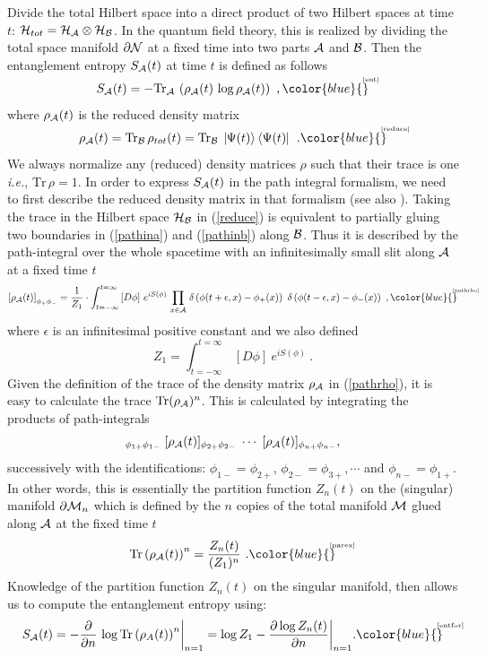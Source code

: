 \documentclass[12pt]{article}
\newcommand{\be}{\begin{equation}}
\newcommand{\ee}{\end{equation}}
\def\req#1{(\ref{#1})}
\def\[{\left [}
\def\]{\right ]}
\def\({\left (}
\def\){\right )}
\def\ie{{\it i.e.}}
\def\eps{\epsilon}
\def\p{\partial}
\def\CA{{\cal A}}
\def\CB{{\cal B}}
\def\CH{{\cal H}}
\def\p{\partial}
\def\p{\partial}
\def\ket#1{\mid  \! \! #1   \rangle}
\def\bra#1{\langle   #1 \! \! \mid}
\def\Label#1{\label{#1}%
{ \color{blue}{\smash{\hbox to0pt{\raise2ex\hbox{\tiny[#1]}\hss}}}}}
\def\bdy{\p{\cal M}}
\def\bdys{\p{\cal N}}
\def\rA{\CA}
\def\rB{\CB}
\begin{document}
Divide the total Hilbert space into a direct product of two Hilbert
spaces at time $t$: $\CH_{tot}=\CH_\rA\otimes \CH_\rB$.
 In the quantum field theory, this is realized by dividing the
  total space manifold $\bdys$ at a fixed time into two parts $\rA$ and $\rB$.
Then the entanglement entropy $S_\rA(t)$ at time $t$ is defined as follows
%
\begin{equation}
S_\rA(t)=-\mbox{Tr}_{\rA}\,\(\rho_\rA(t)\, \log\rho_\rA(t) \) \ ,
\Label{ent}
\end{equation}
%
where $\rho_\rA(t)$ is the reduced density matrix
%
\begin{equation}
\rho_\rA(t)=\mbox{Tr}_{\rB}\, \rho_{tot}(t)
=\mbox{Tr}_{\rB}\,\ket{\Psi(t)}\, \bra{\Psi(t)} \ . \Label{reduce}
\end{equation}
%
We always normalize any (reduced) density matrices $\rho$ such that
their trace is one \ie, $\mbox{Tr}\, \rho=1$. In order to express
$S_\rA(t)$ in the path integral formalism, we need to first describe
the reduced density matrix in that formalism (see also
\cite{Calabrese:2004eu, Calabrese:2005in, Fursaev:2006ng,
Ryu:2006ef}). Taking the trace in the Hilbert space $\CH_\rB$ in
(\ref{reduce}) is equivalent to partially gluing two boundaries in
(\ref{pathina}) and (\ref{pathinb}) along $\rB$. Thus it is
described by the path-integral over the whole spacetime with an
infinitesimally small slit along $\rA$ at a fixed time $t$
%
\begin{equation}
\[ \rho_\rA(t)\]_{\phi_+ \phi_-} = {1\over Z_1} \cdot \int
^{t=\infty}_{t=-\infty} \,[D\phi]~ e^{iS(\phi)}\, \prod_{x\in
\rA}\, \delta\left(\phi(t+\eps,x)-\phi_+(x)\right)\, \,
\delta\left(\phi(t-\eps,x)-\phi_-(x)\right) \ ,
\Label{pathrho}
\end{equation}
%
 where
$\eps$ is an infinitesimal positive constant and we also defined
%
\be Z_1=\int ^{t=\infty}_{t=-\infty} \, [D\phi]~
e^{iS(\phi)} \ .\ee
%
Given the definition of the trace of the density matrix $\rho_\rA$ in \req{pathrho},
 it is easy to calculate the trace ${\rm Tr }(\rho_\rA)^n$. This
  is  calculated by integrating the products of path-integrals
%
\be
[\rho_\rA(t)]_{\phi_{1+} \phi_{1-}} \; [\rho_\rA(t)]_{\phi_{2+} \phi_{2-}}\; \cdots
\; [\rho_\rA(t)]_{\phi_{n+} \phi_{n-}},\ee
%
successively with the identifications:
$\phi_{1-}=\phi_{2+}$, $\phi_{2-}=\phi_{3+},\cdots$ and $\phi_{n-}=\phi_{1+}$.
 In other words, this is essentially the partition function $Z_n(t)$ on the
 (singular) manifold $\bdy_n$ which is
 defined by the $n$ copies of the total manifold ${\cal{M}}$ glued along $\rA$
at the fixed time $t$
%
\begin{equation}
\mbox{Tr}\(\rho_\rA(t)\)^n=\frac{Z_n(t)}{(Z_1)^n}  \ .
\Label{parex}
\end{equation}
%
Knowledge of the partition function $Z_n(t)$ on the singular
manifold, then allows us to compute the entanglement entropy using:
%
\begin{equation}
 S_\rA(t)=-\frac{\p}{\p n} \, \log \mbox{Tr}\(\rho_A(t)\)^n\biggr|_{n=1}= \log
Z_1-\frac{\p \log Z_n(t)}{\p n}\biggr|_{n=1}. \Label{entfor}
\end{equation}
%
\end{document}
